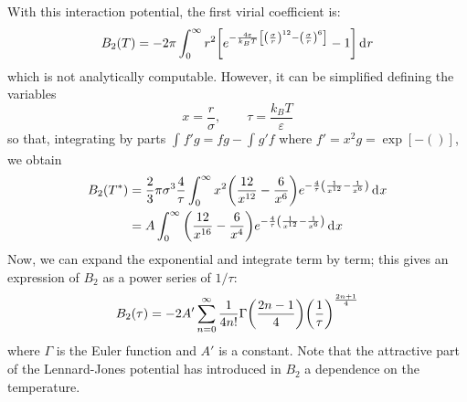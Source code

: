 \documentclass[../main/main.tex]{subfiles}
\begin{document}
With this interaction potential, the first virial coefficient is:
\begin{equation*}
  B_2 (T) = - 2 \pi \int_{0}^{\infty } r^2 \qty[e^{- \frac{4 \varepsilon }{k_B T} \qty[\qty(\frac{\sigma }{r})^{12} - \qty(\frac{\sigma }{r})^6] } -1] \dd[]{r}
\end{equation*}
which is not analytically computable. However, it can be simplified defining the variables
\begin{equation*}
  x = \frac{r}{\sigma }, \qquad \tau = \frac{k_B T}{\varepsilon }
\end{equation*}
 so that, integrating by parts \( \int_{}^{} f' g = fg - \int_{}^{} g' f    \) where \( f' = x^2 g = \exp [-()]   \), we obtain
\begin{equation*}
\begin{split}
  B_2 (T^*) &= \frac{2}{3} \pi \sigma ^3 \frac{4}{\tau } \int_{0}^{\infty } x^2  \qty(\frac{12}{x^{12}}- \frac{6}{x^6}) e^{- \frac{4}{\tau } \qty(\frac{1}{x^{12}} - \frac{1}{x^6}) }  \dd[]{x}  \\
  & = A \int_{0}^{\infty } \qty(\frac{12}{x^{16}}- \frac{6}{x^4}) e^{- \frac{4}{\tau } \qty(\frac{1}{x^{12}} - \frac{1}{x^6}) } \dd[]{x}
\end{split}
\end{equation*}
Now, we can expand the exponential and integrate term by term; this gives an expression of \( B_2 \) as a power series of \( 1/\tau  \):
\begin{equation}
  B_2 (\tau ) = - 2 A' \sum_{n=0}^{\infty } \frac{1}{4n!} \Gamma \qty(\frac{2n-1}{4}) \qty(\frac{1}{\tau })^{\frac{2n+1}{4}}
\end{equation}
where \( \Gamma  \) is the Euler function and \( A' \) is a constant.  Note that the attractive part of the Lennard-Jones potential has introduced in \( B_2 \) a dependence on the temperature.
\end{document}
